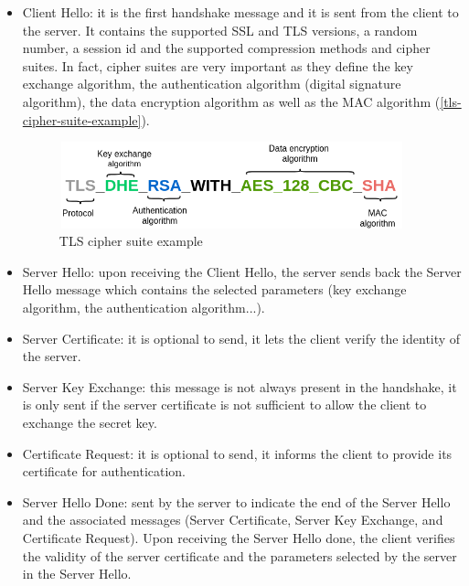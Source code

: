 \begin{itemize}
\setlength{\labelwidth}{10pt}
  \item Client Hello: it is the first handshake message and it is sent from the client to the server.
  It contains the supported \ac{SSL} and \ac{TLS} versions, a random number, a session id and the supported compression methods and cipher suites. In fact, cipher suites are very important
  as they define the key exchange algorithm, the authentication algorithm (digital signature algorithm),
  the data encryption algorithm as well as the MAC algorithm (\autoref{tls-cipher-suite-example}).

  \begin{figure}[H]
  \centering
  \includegraphics[width=10cm,height=2.5cm]{figures/dtls/tls-cipher-suite-example.png}
  \caption{TLS cipher suite example}\label{tls-cipher-suite-example}
  \end{figure}

  \item Server Hello: upon receiving the Client Hello, the server sends back the Server Hello message
  which contains the selected parameters (key exchange algorithm, the authentication algorithm...).

  \item Server Certificate: it is optional to send, it lets the client verify the identity of the server.

  \item Server Key Exchange: this message is not always present in the handshake, it is only sent if
  the server certificate is not sufficient to allow the client to exchange the secret key.

  \item Certificate Request: it is optional to send, it informs the client to provide its certificate
  for authentication.

  \item Server Hello Done: sent by the server to indicate the end of the Server Hello and the associated messages
  (Server Certificate, Server Key Exchange, and Certificate Request). Upon receiving the Server Hello done, the client verifies the validity of the server certificate and the parameters selected by the server in the Server Hello.


\end{itemize}
